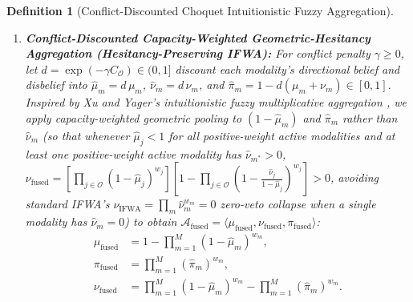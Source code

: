 \documentclass[10pt,twocolumn]{article}
\newtheorem{definition}{Definition}
\begin{document}
\begin{definition}[Conflict-Discounted Choquet Intuitionistic Fuzzy Aggregation]
\begin{enumerate}[leftmargin=1.4em,itemsep=1pt]
    all vacuous modalities with $r_m = 0$ placed at the tail), let $\bar{g}_{\sigma(k)} =
    \allowbreak \frac{g_{\sigma(k)} r_{\sigma(k)} a_{\sigma(k)}}{\sum_{j=1}^M g_{\sigma(j)}
    r_{\sigma(j)} a_{\sigma(j)}}$. Defining cumulative coalition capacities $G_k =
    (\sum_{j=1}^k \bar{g}_{\sigma(j)})^p$ with $G_0 = 0$, the certainty-ordered Choquet
    capacity increment weights (which for $p \neq 1$ are piecewise smooth on strict
    certainty-ordering chambers and defined at positive-certainty ties by the canonical index
    order) are:
    \begin{equation}
    \label{eq:choquet_weights}
    w_{\sigma(k)} = G_k - G_{k-1}, \qquad \forall k \in \{1,\dots,M\}.
    \end{equation}
    \item \textbf{Conflict-Discounted Capacity-Weighted Geometric-Hesitancy Aggregation
    (Hesitancy-Preserving IFWA):} For conflict penalty $\gamma \ge 0$, let $d = \exp(-\gamma
    C_{\mathcal{O}}) \in (0, 1]$ discount each modality's directional belief and disbelief into
    $\hat{\mu}_m = d\,\mu_m$, $\hat{\nu}_m = d\,\nu_m$, and $\hat{\pi}_m = 1 - d(\mu_m + \nu_m)
    \in [0, 1]$. Inspired by Xu and Yager's intuitionistic fuzzy multiplicative aggregation
    \cite{xu2006some,xu2007intuitionistic}, we apply capacity-weighted geometric pooling to $(1
    - \hat{\mu}_m)$ and $\hat{\pi}_m$ rather than $\hat{\nu}_m$ (so that whenever $\hat{\mu}_j
    < 1$ for all positive-weight active modalities and at least one positive-weight active
    modality has $\hat{\nu}_{m^*} > 0$, $\nu_{\text{fused}} =
    [\prod_{j\in\mathcal{O}}(1-\hat{\mu}_j)^{w_j}][1 - \prod_{j\in\mathcal{O}}(1 -
    \frac{\hat{\nu}_j}{1-\hat{\mu}_j})^{w_j}] > 0$, avoiding standard IFWA's $\nu_{\text{IFWA}}
    = \prod_m \hat{\nu}_m^{w_m} = 0$ zero-veto collapse when a single modality has $\hat{\nu}_m
    = 0$) to obtain $\mathcal{A}_{\text{fused}} = \langle \mu_{\text{fused}},
    \nu_{\text{fused}}, \pi_{\text{fused}} \rangle$:
    \begin{equation}
    \label{eq:ifwa_closed}
    \begin{aligned}
    \mu_{\text{fused}} &= 1 - \prod_{m=1}^M (1 - \hat{\mu}_m)^{w_m}, \\
    \pi_{\text{fused}} &= \prod_{m=1}^M (\hat{\pi}_m)^{w_m}, \\
    \nu_{\text{fused}} &= \prod_{m=1}^M (1 - \hat{\mu}_m)^{w_m} - \prod_{m=1}^M
    (\hat{\pi}_m)^{w_m}.
    \end{aligned}
    \end{equation}

\end{enumerate}
\end{definition}
\end{document}

